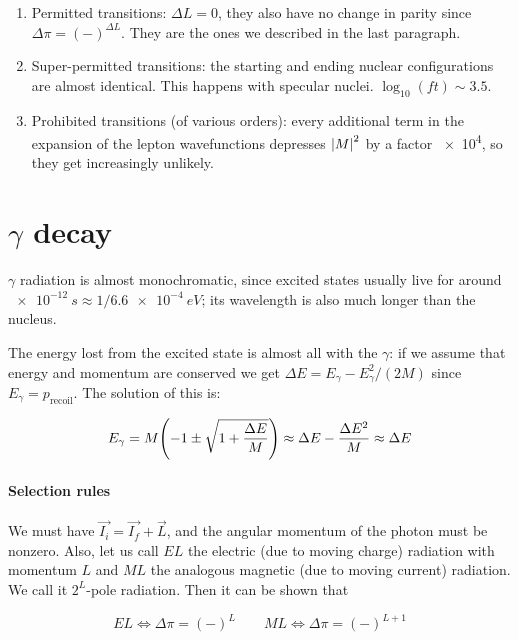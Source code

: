 \documentclass[main.tex]{subfiles}
\begin{document}
\begin{enumerate}
    \item Permitted transitions: \(\Delta L =0\), they also have no change in parity since \(\Delta \pi = (-)^{\Delta L}\). They are the ones we described in the last paragraph.
    \item Super-permitted transitions: the starting and ending nuclear configurations are almost identical. This happens with specular nuclei. \(\log_{10}(ft) \sim 3.5 \).
    \item Prohibited transitions (of various orders): every additional term in the expansion of the lepton wavefunctions depresses \(\abs{M}^{2} \) by a factor \SI{e4}{}, so they get increasingly unlikely.
\end{enumerate}

\section{\(\gamma \) decay}

\(\gamma\) radiation is almost monochromatic, since excited states usually live for around \(\SI{e-12}{s} \approx 1/ \SI{6.6e-4}{eV} \); its wavelength is also much longer than the nucleus.

The energy lost from the excited state is almost all with the \(\gamma\): if we assume that energy and momentum are conserved we get \(\Delta E = E_\gamma - E_\gamma^2 / (2M)\) since \(E_\gamma = p_{\text{recoil}}\). The solution of this is:

\begin{equation}
    E_\gamma = M \qty(-1 \pm \sqrt{1+ \frac{\Delta E}{M}} ) \approx \Delta E - \frac{\Delta E ^2}{M} \approx \Delta E
\end{equation}

\paragraph{Selection rules}

We must have \(\vec{I_i} = \vec{I_f} + \vec{L} \), and the angular momentum of the photon must be nonzero. Also, let us call \(EL\) the electric (due to moving charge) radiation with momentum \(L\) and \(ML\) the analogous magnetic (due to moving current) radiation. We call it \(2^L\)-pole radiation. Then it can be shown that

\begin{equation}
    EL \iff \Delta \pi = (-)^L \qquad
    ML \iff \Delta \pi = (-)^{L+1}
\end{equation}
\end{document}
